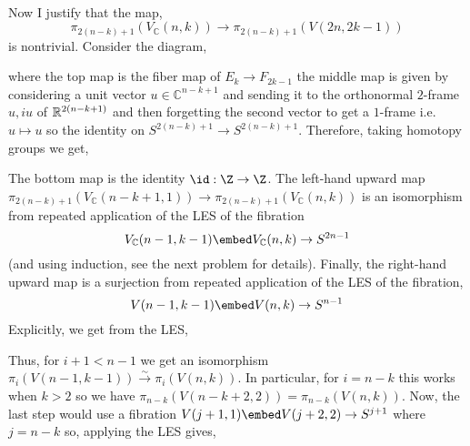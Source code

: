 \documentclass[12pt]{extarticle}
\newcommand{\C}{\mathbb{C}}
\begin{document}
\bigskip\\
Now I justify that the map,
\[ \pi_{2(n - k) + 1}(V_\C(n, k)) \to \pi_{2(n - k) + 1}(V(2n, 2k - 1)) \]
is nontrivial. Consider the diagram,
\begin{center}
\end{center}
where the top map is the fiber map of $E_k \to F_{2k - 1}$ the middle map is given by considering a unit vector $u \in \C^{n - k + 1}$ and sending it to the orthonormal $2$-frame $u, iu$ of $\mathbb{R}^{2(n - k + 1)}$ and then forgetting the second vector to get a $1$-frame i.e. $u \mapsto u$ so the identity on $S^{2(n - k) + 1} \to S^{2(n - k) + 1}$. Therefore, taking homotopy groups we get,
\begin{center}
\end{center}
The bottom map is the identity $\id : \Z \to \Z$. The left-hand upward map $\pi_{2(n-k) + 1}(V_\C(n - k + 1, 1)) \to \pi_{2(n-k) + 1}(V_\C(n, k))$ is an isomorphism from repeated application of the LES of the fibration
\[ V_\C(n - 1, k - 1) \embed V_\C(n, k) \to S^{2n - 1} \]
(and using induction, see the next problem for details). Finally, the right-hand upward map is a surjection from repeated application of the LES of the fibration,
\[ V(n - 1, k - 1) \embed V(n, k) \to S^{n - 1} \] Explicitly, we get from the LES,
\begin{center}
\end{center}
Thus, for $i + 1 < n - 1$ we get an isomorphism $\pi_i(V(n - 1, k - 1)) \xrightarrow{\sim} \pi_i(V(n, k))$. In particular, for $i = n - k$ this works when $k > 2$ so we have $\pi_{n-k}(V(n - k + 2, 2)) = \pi_{n-k}(V(n, k))$. Now, the last step would use a fibration $V(j + 1, 1) \embed V(j + 2, 2) \to S^{j+1}$ where $j = n - k$ so, applying the LES gives,
\end{document}
